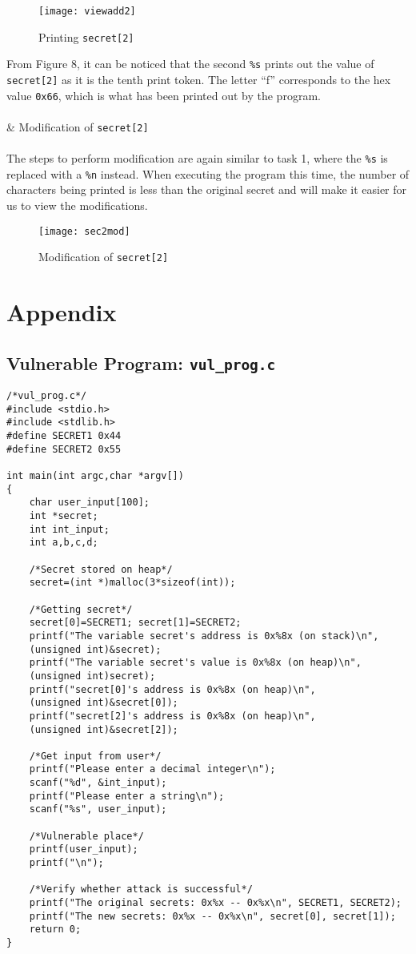 \documentclass[a4paper,12pt]{article}
\newcommand*\circled[1]{\tikz[baseline=(char.base)]{
		\node[shape=circle,draw,inner sep=2pt] (char) {#1};}}
\begin{document}
\begin{figure}[H]
	\centering
	\texttt{[image: viewadd2]}
	\caption{Printing \texttt{secret[2]}}
	\label{fig:viewadd2}
\end{figure}
\noindent From Figure 8, it can be noticed that the second \texttt{\%s} prints out the value of \texttt{secret[2]} as it is the tenth print token. The letter ``f'' corresponds to the hex value \texttt{0x66}, which is what has been printed out by the program.\\\\
\circled{3} \& \circled{4} Modification of \texttt{secret[2]}\\\\The steps to perform modification are again similar to task 1, where the \texttt{\%s} is replaced with a \texttt{\%n} instead. When executing the program this time, the number of characters being printed is less than the original secret and will make it easier for us to view the modifications.
\begin{figure}[H]
	\centering
	\texttt{[image: sec2mod]}
	\caption{Modification of \texttt{secret[2]}}
	\label{fig:sec2mod}
\end{figure}

	\newpage
	\section{Appendix}
	\subsection{Vulnerable Program: \texttt{vul\_prog.c}}
	\begin{verbatim}
/*vul_prog.c*/
#include <stdio.h>
#include <stdlib.h>
#define SECRET1 0x44
#define SECRET2 0x55

int main(int argc,char *argv[])
{
    char user_input[100];
    int *secret;
    int int_input;
    int a,b,c,d;

    /*Secret stored on heap*/
    secret=(int *)malloc(3*sizeof(int));

    /*Getting secret*/
    secret[0]=SECRET1; secret[1]=SECRET2;
    printf("The variable secret's address is 0x%8x (on stack)\n", 
    (unsigned int)&secret);
    printf("The variable secret's value is 0x%8x (on heap)\n", 
    (unsigned int)secret);
    printf("secret[0]'s address is 0x%8x (on heap)\n", 
    (unsigned int)&secret[0]);
    printf("secret[2]'s address is 0x%8x (on heap)\n", 
    (unsigned int)&secret[2]);

    /*Get input from user*/
    printf("Please enter a decimal integer\n");
    scanf("%d", &int_input);
    printf("Please enter a string\n");
    scanf("%s", user_input);

    /*Vulnerable place*/
    printf(user_input);
    printf("\n");

    /*Verify whether attack is successful*/
    printf("The original secrets: 0x%x -- 0x%x\n", SECRET1, SECRET2);
    printf("The new secrets: 0x%x -- 0x%x\n", secret[0], secret[1]);
    return 0;
}
\end{verbatim}
\newpage
\end{document}
